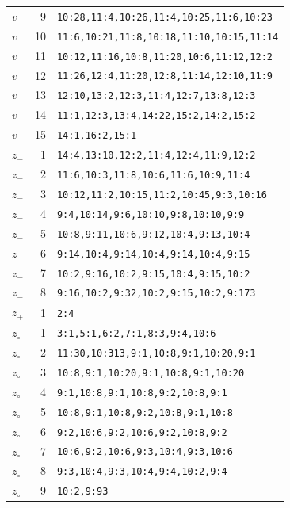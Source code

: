 \begin{longtable}{@{}l r p{}@{}}
$v$ & 9 & \texttt{10:28,11:4,10:26,11:4,10:25,11:6,10:23} \\
$v$ & 10 & \texttt{11:6,10:21,11:8,10:18,11:10,10:15,11:14} \\
$v$ & 11 & \texttt{10:12,11:16,10:8,11:20,10:6,11:12,12:2} \\
$v$ & 12 & \texttt{11:26,12:4,11:20,12:8,11:14,12:10,11:9} \\
$v$ & 13 & \texttt{12:10,13:2,12:3,11:4,12:7,13:8,12:3} \\
$v$ & 14 & \texttt{11:1,12:3,13:4,14:22,15:2,14:2,15:2} \\
$v$ & 15 & \texttt{14:1,16:2,15:1} \\
$z_-$ & 1 & \texttt{14:4,13:10,12:2,11:4,12:4,11:9,12:2} \\
$z_-$ & 2 & \texttt{11:6,10:3,11:8,10:6,11:6,10:9,11:4} \\
$z_-$ & 3 & \texttt{10:12,11:2,10:15,11:2,10:45,9:3,10:16} \\
$z_-$ & 4 & \texttt{9:4,10:14,9:6,10:10,9:8,10:10,9:9} \\
$z_-$ & 5 & \texttt{10:8,9:11,10:6,9:12,10:4,9:13,10:4} \\
$z_-$ & 6 & \texttt{9:14,10:4,9:14,10:4,9:14,10:4,9:15} \\
$z_-$ & 7 & \texttt{10:2,9:16,10:2,9:15,10:4,9:15,10:2} \\
$z_-$ & 8 & \texttt{9:16,10:2,9:32,10:2,9:15,10:2,9:173} \\
$z_+$ & 1 & \texttt{2:4} \\
$z_\circ$ & 1 & \texttt{3:1,5:1,6:2,7:1,8:3,9:4,10:6} \\
$z_\circ$ & 2 & \texttt{11:30,10:313,9:1,10:8,9:1,10:20,9:1} \\
$z_\circ$ & 3 & \texttt{10:8,9:1,10:20,9:1,10:8,9:1,10:20} \\
$z_\circ$ & 4 & \texttt{9:1,10:8,9:1,10:8,9:2,10:8,9:1} \\
$z_\circ$ & 5 & \texttt{10:8,9:1,10:8,9:2,10:8,9:1,10:8} \\
$z_\circ$ & 6 & \texttt{9:2,10:6,9:2,10:6,9:2,10:8,9:2} \\
$z_\circ$ & 7 & \texttt{10:6,9:2,10:6,9:3,10:4,9:3,10:6} \\
$z_\circ$ & 8 & \texttt{9:3,10:4,9:3,10:4,9:4,10:2,9:4} \\
$z_\circ$ & 9 & \texttt{10:2,9:93} \\
\hline
\end{longtable}
